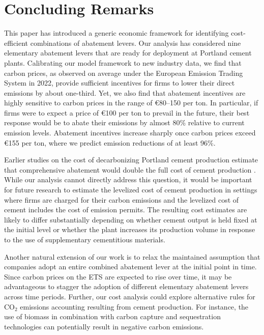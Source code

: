 \documentclass[12pt, a4paper]{article} %
\begin{document}
\section{Concluding Remarks}
\label{sec: conclusion}

This paper has introduced a generic economic framework for identifying cost-efficient combinations of abatement levers. Our analysis has considered nine elementary abatement levers that are ready for deployment at Portland cement plants. Calibrating our model framework to new industry data, we find that carbon prices, as observed on average under the European Emission Trading System in 2022, provide sufficient incentives for firms to lower their direct emissions by about one-third. Yet, we also find that abatement incentives are highly sensitive to carbon prices in the range of \euro 80--150 per ton. In particular, if firms were to expect a price of \euro 100 per ton to prevail in the future, their best response would be to abate their emissions by almost 80\% relative to current emission levels. Abatement incentives increase sharply once carbon prices exceed \euro 155 per ton, where we predict emission reductions of at least 96\%.

Earlier studies on the cost of decarbonizing Portland cement production estimate that comprehensive abatement would double the full cost of cement production \citep{fennell2022going}. While our analysis cannot directly address this question, it would be important for future research to estimate the levelized cost of cement production in settings where firms are charged for their carbon emissions and the levelized cost of cement includes the cost of emission permits. The resulting cost estimates are likely to differ substantially depending on whether cement output is held fixed at the initial level or whether the plant increases its production volume in response to the use of supplementary cementitious materials.

Another natural extension of our work is to relax the maintained assumption that companies adopt an entire combined abatement lever at the initial point in time. Since carbon prices on the ETS are expected to rise over time, it may be advantageous to stagger the adoption of different elementary abatement levers across time periods. Further, our cost analysis could explore alternative  rules for CO$_2$ emissions accounting resulting from cement production. For instance, the use of biomass in combination with carbon capture and sequestration technologies can potentially result in negative carbon emissions.
\end{document}
